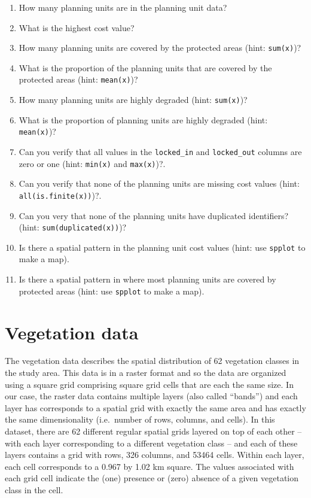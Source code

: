 \documentclass[
  12pt,
]{book}
\makeatletter
\providecommand{\tightlist}{%
  \setlength{\itemsep}{0pt}\setlength{\parskip}{0pt}}
\newenvironment{kframe}{%
\medskip{}
\setlength{\fboxsep}{.8em}
 \def\at@end@of@kframe{}%
 \ifinner\ifhmode%
  \def\at@end@of@kframe{\end{minipage}}%
  \begin{minipage}{\columnwidth}%
 \fi\fi%
 \def\FrameCommand##1{\hskip\@totalleftmargin \hskip-\fboxsep
 \colorbox{shadecolor}{##1}\hskip-\fboxsep
     \hskip-\linewidth \hskip-\@totalleftmargin \hskip\columnwidth}%
 \MakeFramed {\advance\hsize-\width
   \@totalleftmargin\z@ \linewidth\hsize
   \@setminipage}}%
 {\par\unskip\endMakeFramed%
 \at@end@of@kframe}
\newenvironment{rmdblock}[1]
  {
  \begin{itemize}
  \renewcommand{\labelitemi}{
    \raisebox{-.7\height}[0pt][0pt]{
      {\setkeys{Gin}{width=3em,keepaspectratio}\texttt{[image: images/\#1]}}
    }
  }
  \setlength{\fboxsep}{1em}
  \begin{kframe}
  \item
  }
  {
  \end{kframe}
  \end{itemize}
  }
\newenvironment{rmdquestion}
  {\begin{rmdblock}{question}}
  {\end{rmdblock}}
\makeatother
\begin{document}
\begin{rmdquestion}
\begin{enumerate}
\def\labelenumi{\arabic{enumi}.}
\tightlist
\item
  How many planning units are in the planning unit data?
\item
  What is the highest cost value?
\item
  How many planning units are covered by the protected areas (hint: \texttt{sum(x)})?
\item
  What is the proportion of the planning units that are covered by the protected areas (hint: \texttt{mean(x)})?
\item
  How many planning units are highly degraded (hint: \texttt{sum(x)})?
\item
  What is the proportion of planning units are highly degraded (hint: \texttt{mean(x)})?
\item
  Can you verify that all values in the \texttt{locked\_in} and \texttt{locked\_out} columns are zero or one (hint: \texttt{min(x)} and \texttt{max(x)})?.
\item
  Can you verify that none of the planning units are missing cost values (hint: \texttt{all(is.finite(x))})?.
\item
  Can you very that none of the planning units have duplicated identifiers? (hint: \texttt{sum(duplicated(x))})?
\item
  Is there a spatial pattern in the planning unit cost values (hint: use \texttt{spplot} to make a map).
\item
  Is there a spatial pattern in where most planning units are covered by protected areas (hint: use \texttt{spplot} to make a map).
\end{enumerate}
\end{rmdquestion}

\clearpage

\hypertarget{vegetation-data}{%
\section{Vegetation data}\label{vegetation-data}}

The vegetation data describes the spatial distribution of 62 vegetation classes in the study area. This data is in a raster format and so the data are organized using a square grid comprising square grid cells that are each the same size. In our case, the raster data contains multiple layers (also called ``bands'') and each layer has corresponds to a spatial grid with exactly the same area and has exactly the same dimensionality (i.e.~number of rows, columns, and cells). In this dataset, there are 62 different regular spatial grids layered on top of each other -- with each layer corresponding to a different vegetation class -- and each of these layers contains a grid with rows, 326 columns, and 53464 cells. Within each layer, each cell corresponds to a 0.967 by 1.02 km square. The values associated with each grid cell indicate the (one) presence or (zero) absence of a given vegetation class in the cell.
\end{document}
